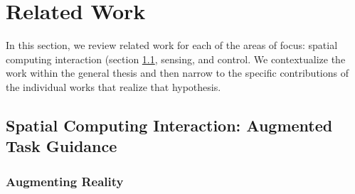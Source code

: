 \documentclass [11pt, proquest] {uwthesis}[2020/02/24]
\begin{document}
 
\chapter{Related Work}
\label{sec:related}

In this section, we review related work for each of the areas of focus: spatial computing interaction (section \ref{sec: Spatial Computing Interaction: Augmented Task Guidance}, sensing, and control. We contextualize the work within the general thesis and then narrow to the specific contributions of the individual works that realize that hypothesis.

\section{Spatial Computing Interaction: Augmented Task Guidance}
\label{sec: Spatial Computing Interaction: Augmented Task Guidance}

\subsection{Augmenting Reality}
\label{subsec: Augmented Reality}
\end{document}
